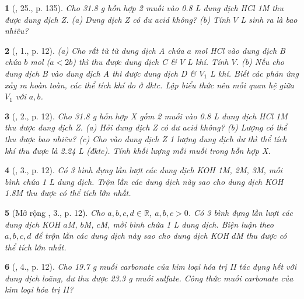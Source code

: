 \documentclass{article}
\newtheorem{baitoan}{}
\begin{document}
\begin{baitoan}[\cite{An_Hoa_Hoc_nang_cao_8_9}, 25., p. 135]
	Cho {\rm31.8 g} hỗn hợp 2 muối {\rm{}} vào {\rm0.8 L} dung dịch {\rm HCl 1M} thu được dung dịch Z. (a) Dung dịch Z có dư acid không? (b) Tính $V$ {\rm L } sinh ra là bao nhiêu?
\end{baitoan}


\begin{baitoan}[\cite{An_400_BT_Hoa_Hoc_9}, 1., p. 12]
	(a) Cho rất từ từ dung dịch A chứa $a$ {\rm mol HCl} vào dung dịch B chứa $b$ {\rm mol } ($a < 2b$) thì thu được dung dịch C \& $V$ {\rm L} khí. Tính $V$. (b) Nếu cho dung dịch B vào dung dịch A thì được dung dịch D \& $V_1$ {\rm L} khí. Biết các phản ứng xảy ra hoàn toàn, các thể tích khí đo ở đktc. Lập biểu thức nêu mối quan hệ giữa $V_1$ với $a,b$.
\end{baitoan}

\begin{baitoan}[\cite{An_400_BT_Hoa_Hoc_9}, 2., p. 12]
	Cho {\rm31.8 g} hỗn hợp X gồm 2 muối {\rm{}} vào {\rm0.8 L} dung dịch {\rm HCl 1M} thu được dung dịch Z. (a) Hỏi dung dịch Z có dư acid không? (b) Lượng {\rm{}} có thể thu được bao nhiêu? (c) Cho vào dung dịch Z 1 lượng dung dịch {\rm{}} dư thì thể tích khí {\rm{}} thu được là {\rm2.24 L} (đktc). Tính khối lượng mỗi muối trong hỗn hợp X.
\end{baitoan}

\begin{baitoan}[\cite{An_400_BT_Hoa_Hoc_9}, 3., p. 12]
	Có 3 bình đựng lần lượt các dung dịch {\rm KOH 1M, 2M, 3M}, mỗi bình chứa {\rm1 L} dung dịch. Trộn lẫn các dung dịch này sao cho dung dịch {\rm KOH 1.8M} thu được có thể tích lớn nhất.
\end{baitoan}

\begin{baitoan}[Mở rộng \cite{An_400_BT_Hoa_Hoc_9}, 3., p. 12]
	Cho $a,b,c,d\in\mathbb{R}$, $a,b,c > 0$. Có 3 bình đựng lần lượt các dung dịch {\rm KOH $a$M, $b$M, $c$M}, mỗi bình chứa {\rm1 L} dung dịch. Biện luận theo $a,b,c,d$ để trộn lẫn các dung dịch này sao cho dung dịch {\rm KOH $d$M} thu được có thể tích lớn nhất.
\end{baitoan}

\begin{baitoan}[\cite{An_400_BT_Hoa_Hoc_9}, 4., p. 12]
	Cho {\rm19.7 g} muối carbonate của kim loại hóa trị {\rm II} tác dụng hết với dung dịch {\rm{}} loãng, dư thu được {\rm23.3 g} muối sulfate. Công thức muối carbonate của kim loại hóa trị {\rm II}?
\end{baitoan}
\end{document}
